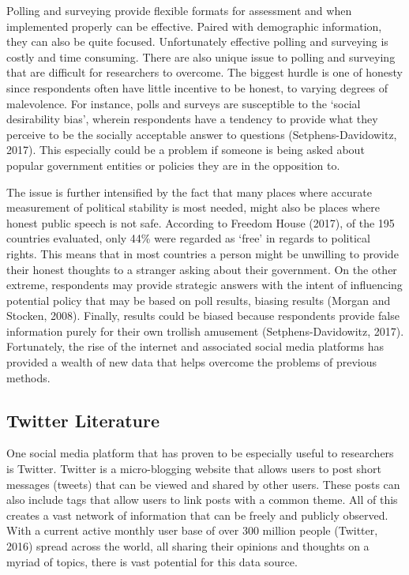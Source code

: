 \documentclass[12pt]{article}
\begin{document}
\begin{spacing}{1.5}
Polling and surveying provide flexible formats for assessment and when implemented properly can be effective. Paired with demographic information, they can also be quite focused. Unfortunately effective polling and surveying is costly and time consuming. There are also unique issue to polling and surveying that are difficult for researchers to overcome. The biggest hurdle is one of honesty since respondents often have little incentive to be honest, to varying degrees of malevolence. For instance, polls and surveys are susceptible to the `social desirability bias', wherein respondents have a tendency to provide what they perceive to be the socially acceptable answer to questions (Setphens-Davidowitz, 2017). This especially could be a problem if someone is being asked about popular government entities or policies they are in the opposition to. 

The issue is further intensified by the fact that many places where accurate measurement of political stability is most needed, might also be places where honest public speech is not safe. According to Freedom House (2017), of the 195 countries evaluated, only 44\% were regarded as `free' in regards to political rights. This means that in most countries a person might be unwilling to provide their honest thoughts to a stranger asking about their government. On the other extreme, respondents may provide strategic answers with the intent of influencing potential policy that may be based on poll results, biasing results (Morgan and Stocken, 2008). Finally, results could be biased because respondents provide false information purely for their own trollish amusement (Setphens-Davidowitz, 2017). Fortunately, the rise of the internet and associated social media platforms has provided a wealth of new data that helps overcome the problems of previous methods. 

\subsection*{Twitter Literature}

One social media platform that has proven to be especially useful to researchers is Twitter. Twitter is a micro-blogging website that allows users to post short messages (tweets) that can be viewed and shared by other users. These posts can also include tags that allow users to link posts with a common theme. All of this creates a vast network of information that can be freely and publicly observed. With a current active monthly user base of over 300 million people (Twitter, 2016) spread across the world, all sharing their opinions and thoughts on a myriad of topics, there is vast potential for this data source. 


\end{spacing}
\end{document}
